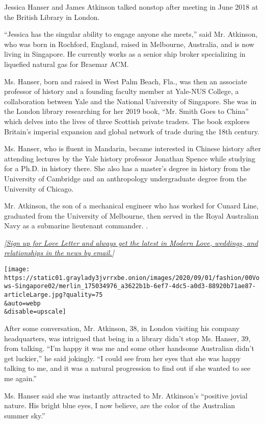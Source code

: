Jessica Hanser and James Atkinson talked nonstop after meeting in June
2018 at the British Library in London.

``Jessica has the singular ability to engage anyone she meets,'' said
Mr. Atkinson, who was born in Rochford, England, raised in Melbourne,
Australia, and is now living in Singapore. He currently works as a
senior ship broker specializing in liquefied natural gas for Braemar
ACM.

Ms. Hanser, born and raised in West Palm Beach, Fla., was then an
associate professor of history and a founding faculty member at Yale-NUS
College, a collaboration between Yale and the National University of
Singapore. She was in the London library researching for her 2019 book,
``Mr. Smith Goes to China'' which delves into the lives of three
Scottish private traders. The book explores Britain's imperial expansion
and global network of trade during the 18th century.

Ms. Hanser, who is fluent in Mandarin, became interested in Chinese
history after attending lectures by the Yale history professor Jonathan
Spence while studying for a Ph.D. in history there. She also has a
master's degree in history from the University of Cambridge and an
anthropology undergraduate degree from the University of Chicago.

Mr. Atkinson, the son of a mechanical engineer who has worked for Cunard
Line, graduated from the University of Melbourne, then served in the
Royal Australian Navy as a submarine lieutenant commander. .

\emph{{[}}\href{https://www.nytimes3xbfgragh.onion/newsletters/love-letter?module=inline}{\emph{Sign
up for Love Letter and always get the latest in Modern Love, weddings,
and relationships in the news by email.}}\emph{{]}}

\texttt{[image: https://static01.graylady3jvrrxbe.onion/images/2020/09/01/fashion/00Vows-Singapore02/merlin\_175034976\_a3622b1b-6ef7-4dc5-a0d3-88920b71ae87-articleLarge.jpg?quality=75\\\&auto=webp\\\&disable=upscale]}

After some conversation, Mr. Atkinson, 38, in London visiting his
company headquarters, was intrigued that being in a library didn't stop
Ms. Hanser, 39, from talking. ``I'm happy it was me and some other
handsome Australian didn't get luckier,'' he said jokingly. ``I could
see from her eyes that she was happy talking to me, and it was a natural
progression to find out if she wanted to see me again.''

Ms. Hanser said she was instantly attracted to Mr. Atkinson's ``positive
jovial nature. His bright blue eyes, I now believe, are the color of the
Australian summer sky.''

